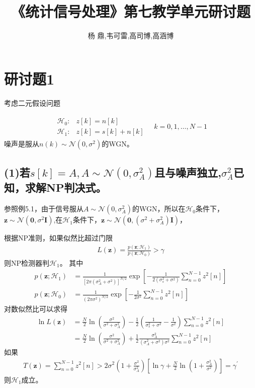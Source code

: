 \documentclass[fontset=windows]{article}
\title{\heiti\zihao{2} 《统计信号处理》第七教学单元研讨题}
\author{杨 鼎,韦可雷,高司博,高涵博}
\date{}
\numberwithin{figure}{section}
\begin{document}
\maketitle
\thispagestyle{empty}



\section{研讨题1}
考虑二元假设问题

\begin{align*}
    \begin{matrix}
        \mathcal{H}_0: & z[k]=n[k]      \\
        \mathcal{H}_1: & z[k]=s[k]+n[k]
    \end{matrix}\quad k=0,1,\ldots,N-1
\end{align*}
噪声是服从\(n(k)\sim \mathcal{N}(0,\sigma^2)\)的WGN。

\subsection*{(1)若\(s[k]=A,A\sim \mathcal{N}(0,\sigma^2_A)\)且与噪声独立,\(\sigma^2_A\)已知，求解NP判决式。}

参照例5.1，由于信号服从\(A\sim \mathcal{N}(0,\sigma^2_A)\)的WGN，所以在\(\mathcal{H}_0\)条件下，\(\mathbf{z}\sim \mathcal{N}(\mathbf{0},\sigma^2\mathbf{I})\),在\(\mathcal{H}_1\)条件下，\(\mathbf{z}\sim \mathcal{N}(\mathbf{0},(\sigma^2+\sigma^2_A)\mathbf{I})\)，

根据NP准则，如果似然比超过门限
\begin{align*}
    L(\mathbf{z})=\frac{p(\mathbf{z};\mathcal{H}_1)}{p(\mathbf{z};\mathcal{H}_0)}>\gamma
\end{align*}
则NP检测器判\(\mathcal{H}_1\)。
其中
\begin{align*}
    p(\mathbf{z};\mathcal{H}_1)
     & =\frac{1}{[2\pi (\sigma_A^2+\sigma^2)]^{N/2}}\exp
    \left[-\frac{1}{2(\sigma^2_s+\sigma^2)}\sum_{n=0}^{N-1}z^2[n] \right] \\
    p(\mathbf{z};\mathcal{H}_0)
     & =\frac{1}{(2\pi\sigma^2)^{N/2}}\exp
    \left[-\frac{1}{2\sigma^2}\sum_{n=0}^{N-1}z^2[n] \right]
\end{align*}
对数似然比可以求得
\begin{align*}
    \ln L(\mathbf{z})
     & =\frac{N}{2}\ln(\frac{\sigma^2}{\sigma^2+\sigma^2_A})-
    \frac{1}{2}(\frac{1}{\sigma^2_s+\sigma^2}-\frac{1}{\sigma^2})\sum_{n=0}^{N-1}z^2[n] \\
     & =\frac{N}{2}\ln(\frac{\sigma^2}{\sigma^2+\sigma^2_A})
    +\frac{1}{2}\frac{\sigma^2_A}{(\sigma^2_A+\sigma^2)\sigma^2}\sum_{n=0}^{N-1}z^2[n]
\end{align*}
如果
\begin{align*}
    T(\mathbf{z})=\sum_{n=0}^{N-1}z^2[n]>2\sigma^2(1+\frac{\sigma^2}{\sigma^2_A})\left[\ln \gamma+\frac{N}{2}\ln(1+\frac{\sigma^2_A}{\sigma^2})\right]=\gamma^{\prime}
\end{align*}
则\(\mathcal{H}_1\)成立。
\end{document}
